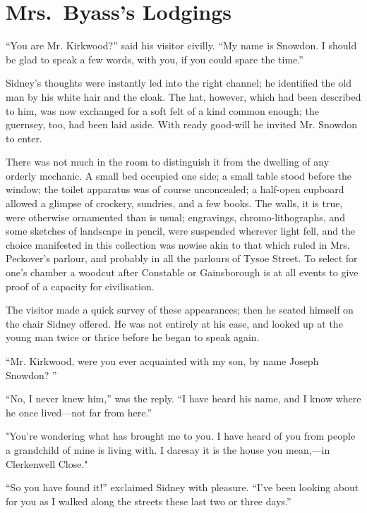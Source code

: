 \chapter{Mrs.\ Byass's Lodgings}

``You are Mr. Kirkwood?'' said his visitor civilly. ``My name is
Snowdon. I should be glad to speak a few words, with you, if you could
spare the time.''

Sidney's thoughts were instantly led into the right channel; he
identified the old man by his white hair and the cloak. The hat,
however, which had been described to him, was now exchanged for a soft
felt of a kind common enough; the guernsey, too, had been laid aside.
With ready good-will he invited Mr. Snowdon to enter.

There was not much in the room to distinguish it from the dwelling of
any orderly mechanic. A small bed occupied one side; a small table stood
before the window; the toilet apparatus was of course unconcealed;
{\protect\hypertarget{144}{}{}}a half-open cupboard allowed a glimpse of
crockery, sundries, and a few books. The walls, it is true, were
otherwise ornamented than is usual; engravings, chromo-lithographs, and
some sketches of landscape in pencil, were suspended wherever light
fell, and the choice manifested in this collection was nowise akin to
that which ruled in Mrs. Peckover's parlour, and probably in all the
parlours of Tysoe Street. To select for one's chamber a woodcut after
Constable or Gainsborough is at all events to give proof of a capacity
for civilisation.

The visitor made a quick survey of these appearances; then he seated
himself on the chair Sidney offered. He was not entirely at his ease,
and looked up at the young man twice or thrice before he began to speak
again.

``Mr. Kirkwood, were you ever acquainted with my son, by name Joseph
Snowdon? ''

``No, I never knew him,'' was the reply. ``I have heard his name, and I
know where he once lived---not far from here.''

"You're wondering what has brought me {\protect\hypertarget{145}{}{}}to
you. I have heard of you from people a grandchild of mine is living
with. I daresay it is the house you mean,---in Clerkenwell Close."

``So you have found it!'' exclaimed Sidney with pleasure. ``I've been
looking about for you as I walked along the streets these last two or
three days.''


